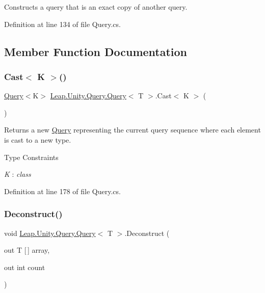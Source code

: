 Constructs a query that is an exact copy of another query. 



Definition at line 134 of file Query.\+cs.



\subsection{Member Function Documentation}
\mbox{\label{struct_leap_1_1_unity_1_1_query_1_1_query_a907b194ea3d1901191343fa409ca6c42}} 
\subsubsection{\texorpdfstring{Cast$<$ K $>$()}{Cast< K >()}}
{\footnotesize\ttfamily \mbox{\hyperlink{struct_leap_1_1_unity_1_1_query_1_1_query}{Query}}$<$K$>$ \mbox{\hyperlink{struct_leap_1_1_unity_1_1_query_1_1_query}{Leap.\+Unity.\+Query.\+Query}}$<$ T $>$.Cast$<$ K $>$ (\begin{DoxyParamCaption}{ }\end{DoxyParamCaption})}



Returns a new \mbox{\hyperlink{struct_leap_1_1_unity_1_1_query_1_1_query}{Query}} representing the current query sequence where each element is cast to a new type. 

\begin{Desc}
\item[Type Constraints]\begin{description}
\item[{\em K} : {\em class}]\end{description}
\end{Desc}


Definition at line 178 of file Query.\+cs.

\mbox{\label{struct_leap_1_1_unity_1_1_query_1_1_query_a411e47e60b7ae4d9df1d64f280feb617}} 
\subsubsection{\texorpdfstring{Deconstruct()}{Deconstruct()}\hspace{0.1cm}{\footnotesize\ttfamily [1/2]}}
{\footnotesize\ttfamily void \mbox{\hyperlink{struct_leap_1_1_unity_1_1_query_1_1_query}{Leap.\+Unity.\+Query.\+Query}}$<$ T $>$.Deconstruct (\begin{DoxyParamCaption}\item[{out T \mbox{[}$\,$\mbox{]}}]{array,  }\item[{out int}]{count }\end{DoxyParamCaption})}



